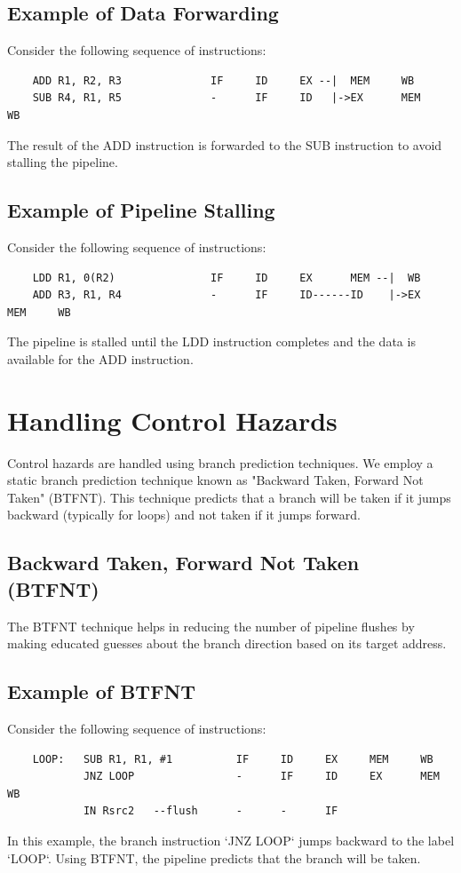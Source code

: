 \documentclass{report}
\begin{document}
\subsection*{Example of Data Forwarding}
Consider the following sequence of instructions:
\begin{verbatim}
    ADD R1, R2, R3              IF     ID     EX --|  MEM     WB
    SUB R4, R1, R5              -      IF     ID   |->EX      MEM     WB
\end{verbatim}
The result of the ADD instruction is forwarded to the SUB instruction to avoid stalling the pipeline.

\subsection*{Example of Pipeline Stalling}
Consider the following sequence of instructions:
\begin{verbatim}
    LDD R1, 0(R2)               IF     ID     EX      MEM --|  WB
    ADD R3, R1, R4              -      IF     ID------ID    |->EX      MEM     WB 
\end{verbatim}
The pipeline is stalled until the LDD instruction completes and the data is available for the ADD instruction.

\section*{Handling Control Hazards}
Control hazards are handled using branch prediction techniques. We employ a static branch prediction technique known as "Backward Taken, Forward Not Taken" (BTFNT). This technique predicts that a branch will be taken if it jumps backward (typically for loops) and not taken if it jumps forward.

\subsection*{Backward Taken, Forward Not Taken (BTFNT)}
The BTFNT technique helps in reducing the number of pipeline flushes by making educated guesses about the branch direction based on its target address.

\subsection*{Example of BTFNT}
Consider the following sequence of instructions:
\begin{verbatim}
    LOOP:   SUB R1, R1, #1          IF     ID     EX     MEM     WB
            JNZ LOOP                -      IF     ID     EX      MEM     WB
            IN Rsrc2   --flush      -      -      IF
\end{verbatim}
In this example, the branch instruction `JNZ LOOP` jumps backward to the label `LOOP`. Using BTFNT, the pipeline predicts that the branch will be taken.
\end{document}
